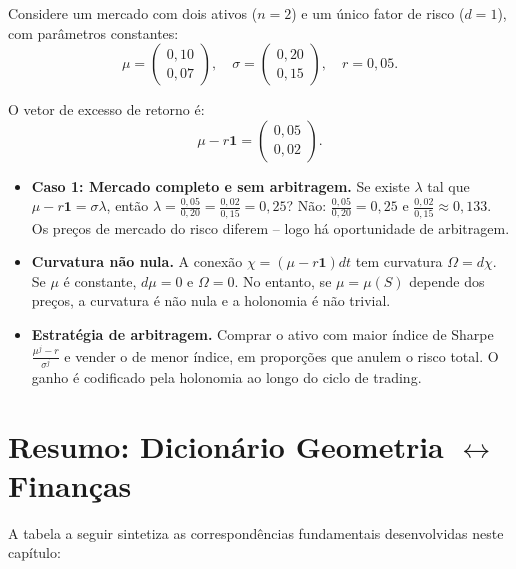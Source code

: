Considere um mercado com dois ativos (\(n=2\)) e um \'unico fator de risco (\(d=1\)), com par\^ametros constantes:
\[
\mu = \begin{pmatrix} 0{,}10 \\ 0{,}07 \end{pmatrix}, \quad
\sigma = \begin{pmatrix} 0{,}20 \\ 0{,}15 \end{pmatrix}, \quad
r = 0{,}05.
\]

O vetor de excesso de retorno \'e:
\[
\mu - r\mathbf{1} = \begin{pmatrix} 0{,}05 \\ 0{,}02 \end{pmatrix}.
\]

\begin{itemize}
 \item \textbf{Caso 1: Mercado completo e sem arbitragem.} Se existe \(\lambda\) tal que \(\mu - r\mathbf{1} = \sigma \lambda\), ent\~ao \(\lambda = \frac{0{,}05}{0{,}20} = \frac{0{,}02}{0{,}15} = 0{,}25\)? N\~ao: \(\frac{0{,}05}{0{,}20} = 0{,}25\) e \(\frac{0{,}02}{0{,}15} \approx 0{,}133\). Os pre\c{c}os de mercado do risco diferem -- logo h\'a oportunidade de arbitragem.

 \item \textbf{Curvatura n\~ao nula.} A conex\~ao \(\chi = (\mu - r\mathbf{1})dt\) tem curvatura \(\Omega = d\chi\). Se \(\mu\) \'e constante, \(d\mu = 0\) e \(\Omega = 0\). No entanto, se \(\mu = \mu(S)\) depende dos pre\c{c}os, a curvatura \'e n\~ao nula e a holonomia \'e n\~ao trivial.

 \item \textbf{Estrat\'egia de arbitragem.} Comprar o ativo com maior \'indice de Sharpe \(\frac{\mu^j - r}{\sigma^j}\) e vender o de menor \'indice, em propor\c{c}\~oes que anulem o risco total. O ganho \'e codificado pela holonomia ao longo do ciclo de trading.
\end{itemize}

\section{Resumo: Dicion\'ario Geometria \(\leftrightarrow\) Finan\c{c}as}

A tabela a seguir sintetiza as correspond\^encias fundamentais desenvolvidas neste cap\'itulo:


